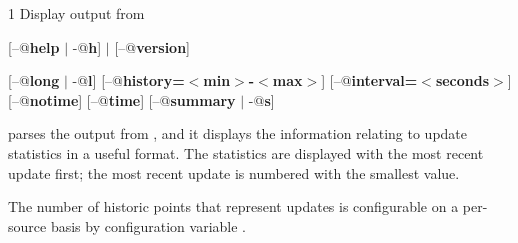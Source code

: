\begin{ManPage}{\label{man-condor-updates-stats}}{1}
{Display output from }

\Synopsis {}
[\verb@--@\textbf{help} $|$ \verb@-@\textbf{h}] $|$ [\verb@--@\textbf{version}]

[\verb@--@\textbf{long} $|$ \verb@-@\textbf{l}]
[\verb@--@\textbf{history=$<$min$>$-$<$max$>$}]
[\verb@--@\textbf{interval=$<$seconds$>$}]
[\verb@--@\textbf{notime}]
[\verb@--@\textbf{time}]
[\verb@--@\textbf{summary} $|$ \verb@-@\textbf{s}]






\Description 

 parses the output from ,
and it displays the information relating to update statistics
in a useful format.
The statistics are displayed with the most recent update first;
the most recent update is numbered with the smallest value.

The number of historic points that represent updates is
configurable on a per-source basis by configuration variable
.


\end{ManPage}
